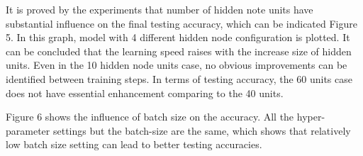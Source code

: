 It is proved by the experiments that number of hidden note units have substantial influence on the final testing accuracy, which can be indicated Figure 5. In this graph, model with 4 different hidden node configuration is plotted. It can be concluded that the learning speed raises with the increase size of hidden units. Even in the 10 hidden node units case, no obvious improvements can be identified between training steps. In terms of testing accuracy, the 60 units case does not have essential enhancement comparing to the 40 units. 

Figure 6 shows the influence of batch size on the accuracy. All the hyper-parameter settings but the batch-size are the same, which shows that relatively low batch size setting can lead to better testing accuracies.



